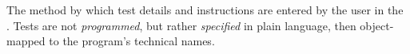 \item[Specification]{
The method by which test details and instructions are entered by the user in the \ite{}. Tests are not \emph{programmed}, but rather \emph{specified} in plain language, then object-mapped to the program's technical names.
}
